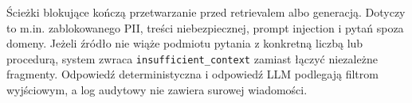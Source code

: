 \documentclass[10pt,a4paper]{article}
\begin{document}
\begin{landscape}
\vfill
\small
Ścieżki blokujące kończą przetwarzanie przed retrievalem albo generacją. Dotyczy to m.in.
zablokowanego PII, treści niebezpiecznej, prompt injection i pytań spoza domeny. Jeżeli
źródło nie wiąże podmiotu pytania z konkretną liczbą lub procedurą, system zwraca
\texttt{insufficient\_context} zamiast łączyć niezależne fragmenty. Odpowiedź deterministyczna
i odpowiedź LLM podlegają filtrom wyjściowym, a log audytowy nie zawiera surowej wiadomości.
\end{landscape}
\end{document}
